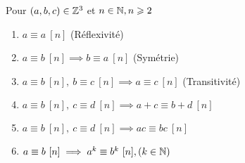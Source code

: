 \begin{graybox}
\begin{proposition}
Pour $(a, b, c) \in \mathbb{Z}^3$ et $n \in \mathbb{N}, n \geqslant 2$ 
\begin{enumerate}
\item $a \equiv a \ [n]$ (Réflexivité)
\item $a \equiv b \ [n] \implies b \equiv a \ [n]$ (Symétrie)
\item $a \equiv b \ [n],\ b \equiv c \ [n] \implies a \equiv c \ [n]$ (Transitivité)
\item $a \equiv b \ [n],\ c \equiv d \ [n] \implies a + c \equiv b + d \ [n]$
\item $a \equiv b \ [n],\ c \equiv d \ [n] \implies ac \equiv bc \ [n]$
\item $a \equiv b \ [n] \implies a^k \equiv b^k \ [n], (k \in \mathbb{N})$ 
\end{enumerate}
\end{proposition}
\end{graybox}

